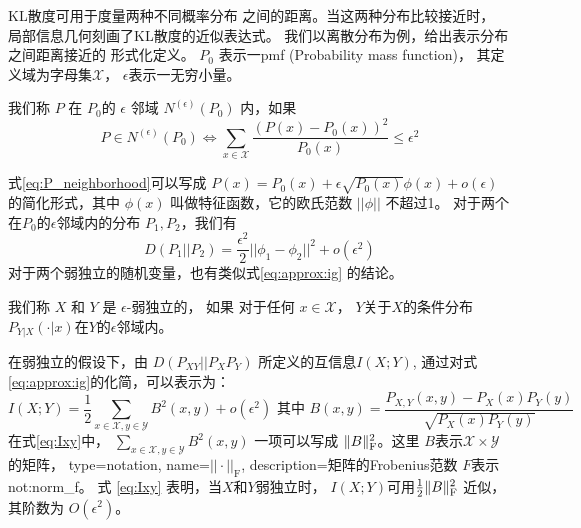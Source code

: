 KL散度可用于度量两种不同概率分布
之间的距离。当这两种分布比较接近时，
局部信息几何刻画了KL散度的近似表达式。
我们以离散分布为例，给出表示分布之间距离接近的
形式化定义。
$P_0$ 表示一\gls{pmf} (Probability mass function)，
其定义域为字母集$\mathcal{X}$，
$\epsilon$表示一无穷小量。
\begin{definition}\label{def:eps_neighborhood}
我们称 $P$ 在 $P_0$的 $\epsilon$ 邻域 $N^{(\epsilon)}(P_0)$ 内，如果
\begin{equation}\label{eq:P_neighborhood}
P \in N^{(\epsilon)}(P_0) \iff
\sum_{x \in \mathcal{X}} \frac{(P(x) - P_0(x))^2}{P_0(x)} \leq \epsilon^2
\end{equation}
\end{definition}
式\eqref{eq:P_neighborhood}可以写成 $P(x) = P_0(x) + \epsilon
\sqrt{P_0(x)} \phi(x) + o(\epsilon)$的简化形式，其中 $\phi(x)$
叫做特征函数，它的欧氏范数 $||\phi || $ 不超过1。
对于两个在$P_0$的$\epsilon$邻域内的分布 $P_1, P_2$，我们有
\begin{equation}\label{eq:approx:ig}
D(P_1 || P_2) = \frac{\epsilon^2}{2} ||\phi_1 - \phi_2||^2 + o(\epsilon^2)
\end{equation}
对于两个弱独立的随机变量，也有类似式\eqref{eq:approx:ig}
的结论。
\begin{definition}\label{def:weak_indepedent}
我们称 $X$ 和 $Y$ 是 $\epsilon$-弱独立的，
如果 对于任何 $x \in \mathcal{X}$，
$Y$关于$X$的条件分布
$P_{Y|X}(\cdot |x)$在$Y$的$\epsilon$邻域内。
\end{definition}
在弱独立的假设下，由 $D(P_{XY}||P_XP_Y)$ 所定义的互信息$I(X;Y)$, 
通过对式\eqref{eq:approx:ig}的化简，可以表示为：
\begin{equation}\label{eq:Ixy}
I(X;Y) = \frac{1}{2}\sum_{x\in \mathcal{X}, y\in \mathcal{Y}} B^2(x,y) + o(\epsilon^2)
\textrm{ 其中 }  B(x,y)=\frac{P_{X,Y}(x,y) - P_X(x) P_Y(y)}{\sqrt{P_X(x)P_Y(y)}}
\end{equation}
在式\eqref{eq:Ixy}中， $\sum_{x\in \mathcal{X}, y\in \mathcal{Y}} B^2(x,y)$
一项可以写成 $\lVert B\rVert_{\mathrm{F}}^2$。这里 $B$表示$\mathcal{X} \times \mathcal{Y}$的矩阵，
{
  type=notation,
  name={$||\cdot||_{\mathrm{F}}$},
  description={矩阵的Frobenius范数}
}
$F$表示\glsdesc{not:norm_f}。
式 \eqref{eq:Ixy} 表明，当$X$和$Y$弱独立时，
$I(X;Y)$可用$\frac{1}{2} \lVert B\rVert_{\mathrm{F}}^2$
近似，其阶数为 $O(\epsilon^2)$。

